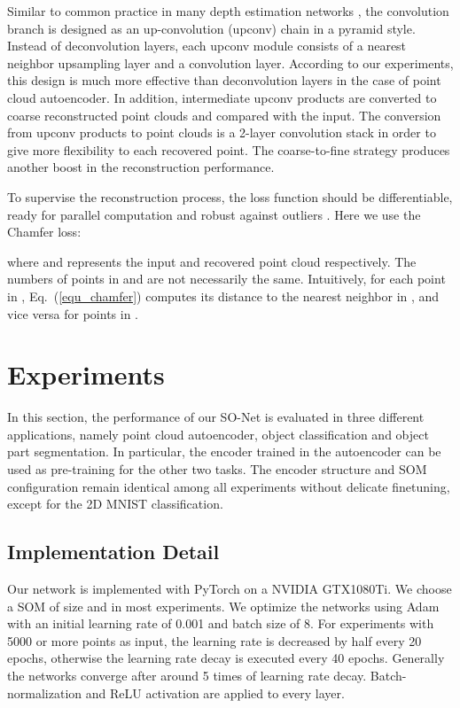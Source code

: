\documentclass[10pt,twocolumn,letterpaper]{article}
\begin{document}
Similar to common practice in many depth estimation networks \cite{garg2016unsupervised,godard2016unsupervised}, the convolution branch is designed as an up-convolution (upconv) chain in a pyramid style. Instead of deconvolution layers, each upconv module consists of a nearest neighbor upsampling layer and a  convolution layer. According to our experiments, this design is much more effective than deconvolution layers in the case of point cloud autoencoder. In addition, intermediate upconv products are converted to coarse reconstructed point clouds and compared with the input. The conversion from upconv products to point clouds is a 2-layer  convolution stack in order to give more flexibility to each recovered point. The coarse-to-fine strategy produces another boost in the reconstruction performance.

To supervise the reconstruction process, the loss function should be differentiable, ready for parallel computation and robust against outliers \cite{fan2016point}. Here we use the Chamfer loss: 


\noindent where  and  represents the input and recovered point cloud respectively. The numbers of points in  and  are not necessarily the same. Intuitively, for each point in , Eq.~(\ref{equ_chamfer}) computes its distance to the nearest neighbor in , and vice versa for points in . 







\section{Experiments} \label{sec_experiments}

In this section, the performance of our SO-Net is evaluated in three different applications, namely point cloud autoencoder, object classification and object part segmentation. In particular, the encoder trained in the autoencoder can be used as pre-training for the other two tasks. The encoder structure and SOM configuration remain identical among all experiments without delicate finetuning, except for the 2D MNIST classification.

\subsection{Implementation Detail}
Our network is implemented with PyTorch on a NVIDIA GTX1080Ti. We choose a SOM of size  and  in most experiments. We optimize the networks using Adam \cite{kingma2014adam} with an initial learning rate of 0.001 and batch size of 8. For experiments with 5000 or more points as input, the learning rate is decreased by half every 20 epochs, otherwise the learning rate decay is executed every 40 epochs. Generally the networks converge after around 5 times of learning rate decay. Batch-normalization and ReLU activation are applied to every layer.
\end{document}
